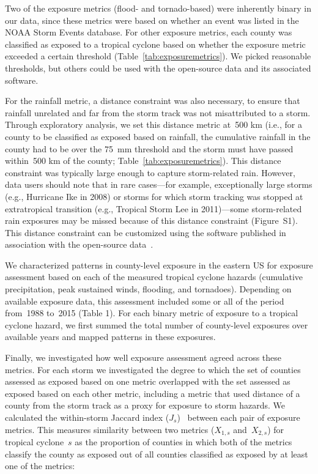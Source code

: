 Two of the exposure metrics (flood- and tornado-based) were inherently binary
in our data, since these metrics were based on whether an event was listed in
the NOAA Storm Events database.  For other exposure metrics, each county
was classified as exposed to a tropical cyclone based on whether the exposure
metric exceeded a certain threshold (Table~\ref{tab:exposuremetrics}). We
picked reasonable thresholds, but others could be used with the open-source
data and its associated software. 

For the rainfall metric, a distance constraint was also necessary, to ensure
that rainfall unrelated and far from the storm track was not misattributed to a
storm. Through exploratory analysis, we set this distance metric at~500
\si{\kilo\metre} (i.e., for a county to be classified as exposed based on
rainfall, the cumulative rainfall in the county had to be over the
75~\si{\milli\metre} threshold and the storm must have passed
within~500 \si{\kilo\metre} of the county; Table~\ref{tab:exposuremetrics}).
This distance constraint was typically large enough to capture storm-related
rain.  However, data users should note that in rare cases---for example,
exceptionally large storms (e.g., Hurricane Ike in 2008) or storms for which
storm tracking was stopped at extratropical transition (e.g., Tropical Storm
Lee in 2011)---some storm-related rain exposures may be missed because of this
distance constraint (Figure~S1). This distance constraint can be customized
using the software published in association with the open-source
data~\parencite{hurricaneexposure}.

We characterized patterns in county-level exposure in the eastern \ac{US} for
exposure assessment based on each of the measured tropical cyclone hazards
(cumulative precipitation, peak sustained winds, flooding, and tornadoes).
Depending on available exposure data, this assessment included some or all of
the period from~1988 to~2015 (Table 1). For each binary metric of exposure to a
tropical cyclone hazard, we first summed the total number of county-level
exposures over available years and mapped patterns in
these exposures. 

Finally, we investigated how well exposure assessment agreed across 
these metrics. For each storm we investigated the degree to which the 
set of counties assessed as exposed based on one metric overlapped with the set
assessed as exposed based on each other metric, including a metric that used
distance of a county from the storm track as a proxy for exposure to storm hazards. 
We calculated the within-storm
Jaccard index ($J_s$)~\parencite{jaccard1901distribution, jaccard1908nouvelles} between
each pair of exposure metrics. This measures similarity
between two metrics ($X_{1,s}$ and~$X_{2,s}$) for tropical cyclone~$s$ as the
proportion of counties in which both of the metrics classify the county as
exposed out of all counties classified as exposed by at least one of the
metrics:

